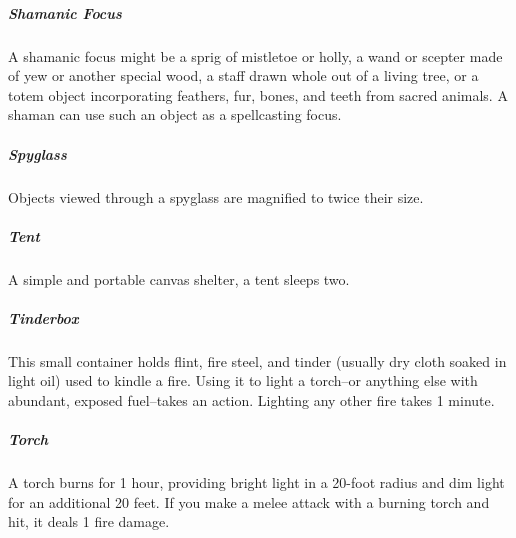 \subparagraph*{Shamanic Focus} A shamanic focus might be a sprig of mistletoe or holly, a wand or scepter made of yew or another special wood, a staff drawn whole out of a living tree, or a totem object incorporating feathers, fur, bones, and teeth from sacred animals. A shaman can use such an object as a spellcasting focus.

\subparagraph*{Spyglass} Objects viewed through a spyglass are magnified to twice their size.

\subparagraph*{Tent} A simple and portable canvas shelter, a tent sleeps two.

\subparagraph*{Tinderbox} This small container holds flint, fire steel, and tinder (usually dry cloth soaked in light oil) used to kindle a fire. Using it to light a torch--or anything else with abundant, exposed fuel--takes an action. Lighting any other fire takes 1 minute.

\subparagraph*{Torch} A torch burns for 1 hour, providing bright light in a 20-foot radius and dim light for an additional 20 feet. If you make a melee attack with a burning torch and hit, it deals 1 fire damage.

